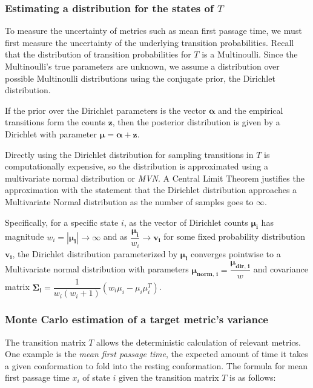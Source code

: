 \documentclass{article}
\begin{document}
\subsubsection{Estimating a distribution for the states of $T$}
To measure the uncertainty of metrics such as mean first passage time, we must first measure the uncertainty of the underlying transition probabilities. Recall that the distribution of transition probabilities for $T$ is a Multinoulli. Since the Multinoulli's true parameters are unknown, we assume a distribution over possible Multinoulli distributions using the conjugate prior, the Dirichlet distribution.

If the prior over the Dirichlet parameters is the vector $\boldsymbol{\alpha}$ and the empirical transitions form the counts $\boldsymbol{z}$, then the posterior distribution is given by a Dirichlet with parameter $\boldsymbol{\mu} = \boldsymbol{\alpha} + \boldsymbol{z}$.

Directly using the Dirichlet distribution for sampling transitions in $T$ is computationally expensive, so the distribution is approximated using a multivariate normal distribution or \textit{MVN}. A Central Limit Theorem justifies the approximation with the statement that the Dirichlet distribution approaches a Multivariate Normal distribution as the number of samples goes to $\infty$. 

Specifically, for a specific state $i$, as the vector of Dirichlet counts $\boldsymbol{\mu_i}$ has magnitude $w_i = |\boldsymbol{\mu_i}| \to \infty$ and as $\dfrac{\boldsymbol{\mu_i}}{w_i} \to \boldsymbol{v_i}$ for some fixed probability distribution $\boldsymbol{v_i}$, the Dirichlet distribution parameterized by $\boldsymbol{\mu_i}$ converges pointwise to a Multivariate normal distribution with parameters $\boldsymbol{\mu_{\text{norm, i}}} = \dfrac{\boldsymbol{\mu_{\text{dir, i}}}}{w}$ and covariance matrix $\boldsymbol{\Sigma_i} = \dfrac{1}{w_i(w_i+1)}(w_i\mu_i - \mu_i\mu^T_i)$.

\subsubsection{Monte Carlo estimation of a target metric's variance}
The transition matrix $T$ allows the deterministic calculation of relevant metrics. One example is the \textit{mean first passage time}, the expected amount of time it takes a given conformation to fold into the resting conformation. The formula for mean first passage time $x_i$ of state $i$ given the transition matrix $T$ is as follows:
\end{document}
